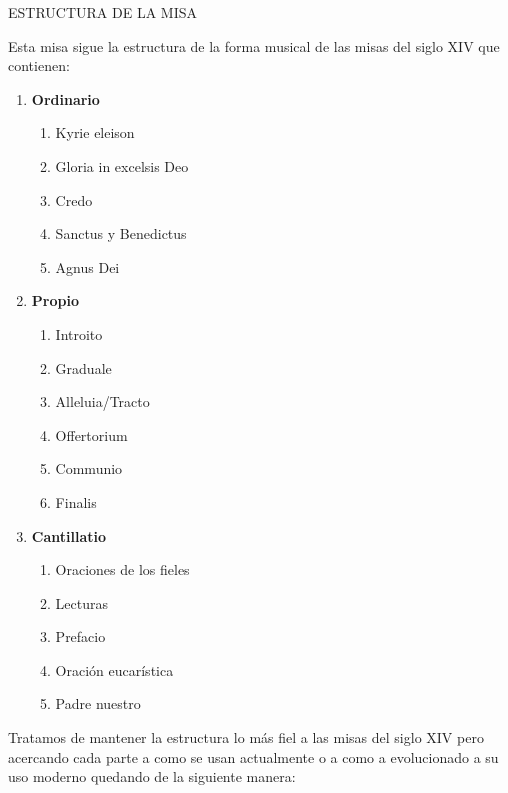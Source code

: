\documentclass[12pt, letterpaper]{report}
\begin{document}
    {\large ESTRUCTURA DE LA MISA}

    Esta misa sigue la estructura de la forma musical de las misas del siglo XIV que contienen:

    \renewcommand{\theenumi}{\arabic{enumi}}
    \begin{enumerate}
        \item \textbf{Ordinario}
        \begin{enumerate}
            \item Kyrie eleison
            \item Gloria in excelsis Deo
            \item Credo
            \item Sanctus y Benedictus
            \item Agnus Dei
        \end{enumerate}

        \item \textbf{Propio}
        \begin{enumerate}
            \item Introito
            \item Graduale
            \item Alleluia/Tracto
            \item Offertorium
            \item Communio
            \item Finalis
        \end{enumerate}

        \item \textbf{Cantillatio}
        \begin{enumerate}
            \item Oraciones de los fieles
            \item Lecturas
            \item Prefacio
            \item Oraci\'on eucar\'istica
            \item Padre nuestro
        \end{enumerate}
    \end{enumerate}

    Tratamos de mantener la estructura lo m\'as fiel a las misas del siglo XIV pero acercando cada parte a como se usan actualmente o a como a evolucionado a su uso moderno quedando de la siguiente manera:
\end{document}
